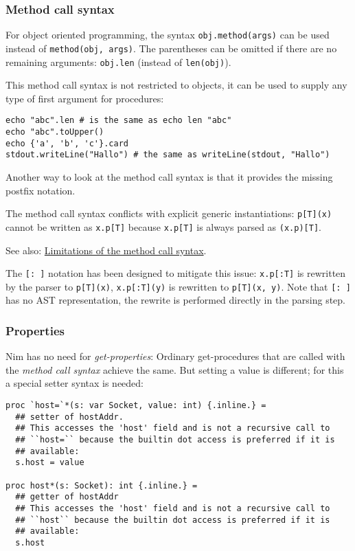 \hypertarget{method-call-syntax}{%
\subsubsection{Method call syntax}\label{method-call-syntax}}

For object oriented programming, the syntax \texttt{obj.method(args)}
can be used instead of \texttt{method(obj,\ args)}. The parentheses can
be omitted if there are no remaining arguments: \texttt{obj.len}
(instead of \texttt{len(obj)}).

This method call syntax is not restricted to objects, it can be used to
supply any type of first argument for procedures:

\begin{verbatim}
echo "abc".len # is the same as echo len "abc"
echo "abc".toUpper()
echo {'a', 'b', 'c'}.card
stdout.writeLine("Hallo") # the same as writeLine(stdout, "Hallo")
\end{verbatim}

Another way to look at the method call syntax is that it provides the
missing postfix notation.

The method call syntax conflicts with explicit generic instantiations:
\texttt{p{[}T{]}(x)} cannot be written as \texttt{x.p{[}T{]}} because
\texttt{x.p{[}T{]}} is always parsed as \texttt{(x.p){[}T{]}}.

See also:
\protect\hyperlink{templates-limitations-of-the-method-call-syntax}{Limitations
of the method call syntax}.

The \texttt{{[}:\ {]}} notation has been designed to mitigate this
issue: \texttt{x.p{[}:T{]}} is rewritten by the parser to
\texttt{p{[}T{]}(x)}, \texttt{x.p{[}:T{]}(y)} is rewritten to
\texttt{p{[}T{]}(x,\ y)}. Note that \texttt{{[}:\ {]}} has no AST
representation, the rewrite is performed directly in the parsing step.

\hypertarget{properties}{%
\subsubsection{Properties}\label{properties}}

Nim has no need for \emph{get-properties}: Ordinary get-procedures that
are called with the \emph{method call syntax} achieve the same. But
setting a value is different; for this a special setter syntax is
needed:

\begin{verbatim}
proc `host=`*(s: var Socket, value: int) {.inline.} =
  ## setter of hostAddr.
  ## This accesses the 'host' field and is not a recursive call to
  ## ``host=`` because the builtin dot access is preferred if it is
  ## available:
  s.host = value

proc host*(s: Socket): int {.inline.} =
  ## getter of hostAddr
  ## This accesses the 'host' field and is not a recursive call to
  ## ``host`` because the builtin dot access is preferred if it is
  ## available:
  s.host
\end{verbatim}

